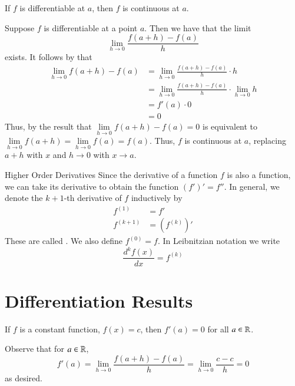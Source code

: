 \documentclass[12pt]{report}
\begin{document}
\begin{thm}{}{}
    If $f$ is differentiable at $a$, then $f$ is continuous at $a$.
\end{thm}
\begin{proof*}{}{}
    Suppose $f$ is differentiable at a point $a$. Then we have that the limit $$\lim\limits_{h\rightarrow 0}\frac{f(a+h) - f(a)}{h}$$ exists. It follows by  that \begin{align*}
        \lim\limits_{h\rightarrow 0}f(a+h) - f(a) &= \lim\limits_{h\rightarrow 0}\frac{f(a+h)-f(a)}{h}\cdot h \\
        &= \lim\limits_{h\rightarrow 0}\frac{f(a+h) - f(a)}{h}\cdot \lim\limits_{h\rightarrow 0} h\\
        &= f'(a)\cdot 0\\
        &= 0
    \end{align*}
    Thus, by  the result that $\lim\limits_{h\rightarrow 0}f(a+h) - f(a) = 0$ is equivalent to $\lim\limits_{h\rightarrow 0}f(a+h) = \lim\limits_{h\rightarrow 0} f(a) = f(a)$. Thus, $f$ is continuous at $a$, replacing $a+h$ with $x$ and $h\rightarrow 0$ with $x \rightarrow a$.
\end{proof*}


\begin{defn}{Higher Order Derivatives}{}
    Since the derivative of a function $f$ is also a function, we can take its derivative to obtain the function $(f')' = f''$. In general, we denote the $k+1$-th derivative of $f$ inductively by \begin{align*}
        f^{(1)} &= f' \\
        f^{(k+1)} &= (f^{(k)})'
    \end{align*}
    These are called . We also define $f^{(0)} = f$. In Leibnitzian notation we write \begin{equation}
        \frac{d^kf(x)}{dx} = f^{(k)}
    \end{equation}
\end{defn}

\section{Differentiation Results}

\begin{thm}{}{}
    If $f$ is a constant function, $f(x) = c$, then $f'(a) = 0$ for all $a \in \mathbb R$.
\end{thm}
\begin{proof*}{}{}
    Observe that for $a \in \mathbb R$, $$f'(a) = \lim\limits_{h\rightarrow 0}\frac{f(a+h)-f(a)}{h} = \lim\limits_{h\rightarrow 0}\frac{c-c}{h} = 0$$
    as desired.
\end{proof*}
\end{document}
